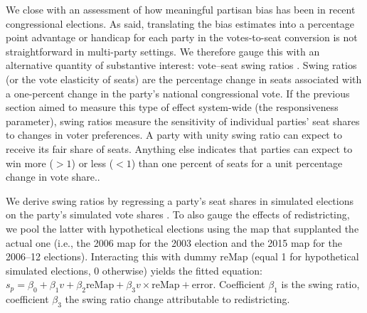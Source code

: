 \documentclass[letter,12pt]{article}
\begin{document}
We close with an assessment of how meaningful partisan bias has been in recent congressional elections. As said, translating the bias estimates into a percentage point advantage or handicap for each party in the votes-to-seat conversion is not straightforward in multi-party settings. We therefore gauge this with an alternative quantity of substantive interest: vote--seat swing ratios \citep{tufte1973seatsVotes,niemi.fett1986swing}. Swing ratios (or the vote elasticity of seats) are the percentage change in seats associated with a one-percent change in the party's national congressional vote. If the previous section aimed to measure this type of effect system-wide (the responsiveness parameter), swing ratios measure the sensitivity of individual parties' seat shares to changes in voter preferences. A party with unity swing ratio can expect to receive its fair share of seats. Anything else indicates that parties can expect to win more ($>1$) or less ($<1$) than one percent of seats for a unit percentage change in vote share.\citep[We rule out negative swing ratios corresponding to a party losing seats as it wins votes; for violations of the monotonicity principle of representation, see][]{balinskiYoung2001FairRep}. 

We derive swing ratios by regressing a party's seat shares in simulated elections on the party's simulated vote shares \citep{linzerSeatVoteElasticity2012}. To also gauge the effects of redistricting, we pool the latter with hypothetical elections using the map that supplanted the actual one (i.e., the 2006 map for the 2003 election and the 2015 map for the 2006--12 elections). Interacting this with dummy $\text{reMap}$ (equal 1 for hypothetical simulated elections, 0 otherwise) yields the fitted equation: $s_p = \beta_0 + \beta_1 v + \beta_2 \text{reMap} + \beta_3 v \times \text{reMap} + \text{error}$. Coefficient $\beta_1$ is the swing ratio, coefficient $\beta_3$ the swing ratio change attributable to redistricting. 
\end{document}
